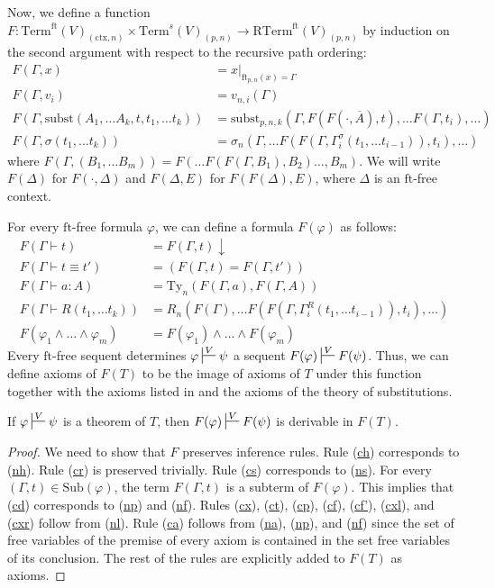 \documentclass[reqno]{amsart}
\newcommand{\axref}[1]{(\hyperref[ax:#1]{#1})}
\theoremstyle{definition}
\theoremstyle{remark}
\newcommand{\fs}[1]{\mathrm{#1}}
\newcommand{\Term}{\fs{Term}}
\newcommand{\RTerm}{\fs{RTerm}}
\newcommand{\subst}{\fs{subst}}
\newcommand{\ft}{\fs{ft}}
\newcommand{\Ty}{\fs{Ty}}
\newcommand{\ctx}{\fs{ctx}}
\newcommand{\sub}{\fs{Sub}}
\numberwithin{figure}{section}
\begin{document}
Now, we define a function $F : \Term^\ft(V)_{(\ctx,n)} \times \Term^s(V)_{(p,n)} \to \RTerm^\ft(V)_{(p,n)}$ by induction on the second argument with respect to the recursive path ordering:
\begin{align*}
F(\Gamma, x) & = x|_{\ft_{p,n}(x) = \Gamma} \\
F(\Gamma, v_i) & = v_{n,i}(\Gamma) \\
F(\Gamma, \subst(A_1, \ldots A_k, t, t_1, \ldots t_k)) & = \subst_{p,n,k}(\Gamma, F(F(\cdot,\overline{A}), t), \ldots F(\Gamma, t_i), \ldots) \\
F(\Gamma, \sigma(t_1, \ldots t_k)) & = \sigma_n(\Gamma, \ldots F(F(\Gamma, \Gamma^\sigma_i(t_1, \ldots t_{i-1})), t_i), \ldots)
\end{align*}
where $F(\Gamma, (B_1, \ldots B_m)) = F(\ldots F(F(\Gamma, B_1), B_2) \ldots, B_m)$.
We will write $F(\Delta)$ for $F(\cdot,\Delta)$ and $F(\Delta,E)$ for $F(F(\Delta),E)$, where $\Delta$ is an $\ft$-free context.

For every $\ft$-free formula $\varphi$, we can define a formula $F(\varphi)$ as follows:
\begin{align*}
F(\Gamma \vdash t) & = F(\Gamma,t)\!\downarrow \\
F(\Gamma \vdash t \equiv t') & = (F(\Gamma,t) = F(\Gamma,t')) \\
F(\Gamma \vdash a : A) & = \Ty_n(F(\Gamma,a),F(\Gamma,A)) \\
F(\Gamma \vdash R(t_1, \ldots t_k)) & = R_n(F(\Gamma), \ldots F(F(\Gamma, \Gamma^R_i(t_1, \ldots t_{i-1})), t_i), \ldots) \\
F(\varphi_1 \land \ldots \land \varphi_m) & = F(\varphi_1) \land \ldots \land F(\varphi_m)
\end{align*}
Every $\ft$-free sequent determines $\varphi \sststile{}{V} \psi$ a sequent $F(\varphi) \sststile{}{V} F(\psi)$.
Thus, we can define axioms of $F(T)$ to be the image of axioms of $T$ under this function together with the axioms listed in  and the axioms of the theory of substitutions.

\begin{lem}[ftmap-th]
If $\varphi \sststile{}{V} \psi$ is a theorem of $T$, then $F(\varphi) \sststile{}{V} F(\psi)$ is derivable in $F(T)$.
\end{lem}
\begin{proof}
We need to show that $F$ preserves inference rules.
Rule \axref{ch} corresponds to \axref{nh}.
Rule \axref{cr} is preserved trivially.
Rule \axref{cs} corresponds to \axref{ns}.
For every $(\Gamma,t) \in \sub(\varphi)$, the term $F(\Gamma,t)$ is a subterm of $F(\varphi)$.
This implies that \axref{cd} corresponds to \axref{np} and \axref{nf}.
Rules \axref{cx}, \axref{ct}, \axref{cp}, \axref{cf}, \axref{cf'}, \axref{cxl}, and \axref{cxr} follow from \axref{nl}.
Rule \axref{ca} follows from \axref{na}, \axref{np}, and \axref{nf} since the set of free variables of the premise of every axiom is contained in the set free variables of its conclusion.
The rest of the rules are explicitly added to $F(T)$ as axioms.
\end{proof}
\end{document}
